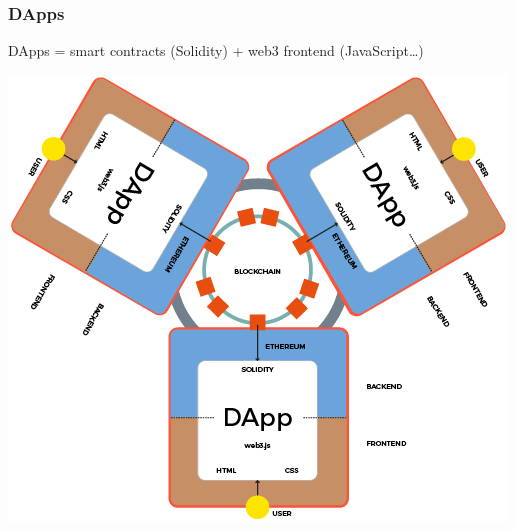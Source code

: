 \documentclass[11pt]{beamer}  %
\begin{document}
\begin{frame}\frametitle{DApps}

  \begin{greenbox}{DApps = smart contracts (Solidity) + web3 frontend (JavaScript\ldots)}
    \begin{center}
      \includegraphics[scale=0.43,clip=false]{pictures/dapps.png}
    \end{center}
  \end{greenbox}

\end{frame}
\end{document}
